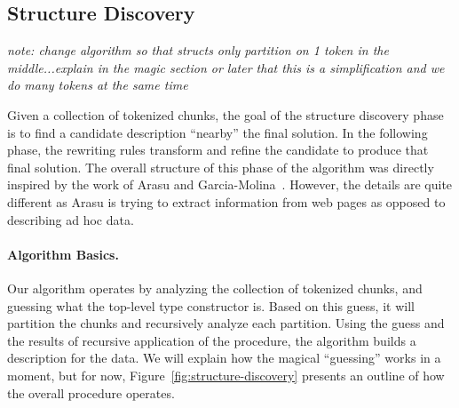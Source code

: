  




\subsection {Structure Discovery}

{\em note: change algorithm so that structs only partition on 1 token
 in the middle...explain in the magic section or later that this
 is a simplification and we do many tokens at the same time}

Given a collection of tokenized chunks, the goal of the structure
discovery phase is to find a candidate description ``nearby'' the
final solution.  In the following phase, the rewriting rules transform
and refine the candidate to produce that final solution.  The overall
structure of this phase of the algorithm was directly inspired by the
work of Arasu and Garcia-Molina~\cite{arasu+:sigmod03}.  However, the
details are quite different as Arasu is trying to extract information
from \html{} web pages as opposed to describing ad hoc data.

\paragraph*{Algorithm Basics.}
Our algorithm operates by analyzing the collection of tokenized chunks,
and guessing what the top-level type constructor is.  Based on this guess,
it will partition the chunks and recursively analyze each partition.
Using the guess and the results of recursive application of the
procedure, the algorithm builds a description for the data.
We will explain how the magical ``guessing'' works
in a moment, but for now, Figure~\ref{fig:structure-discovery} 
presents an outline of how the overall procedure operates.  

